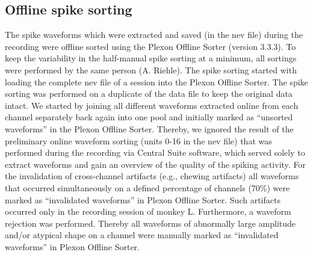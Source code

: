 \subsection{Offline spike sorting}
\label{sec:offline_spike_sorting}
The spike waveforms which were extracted and saved (in the nev file) during the recording were offline sorted using the Plexon Offline Sorter (version 3.3.3). To keep the variability in the half-manual spike sorting at a minimum, all sortings were performed by the same person (A. Riehle). The spike sorting started with loading the complete nev file of a session into the Plexon Offline Sorter. The spike sorting was performed on a duplicate of the data file to keep the original data intact. We started by joining all different waveforms extracted online from each channel separately back again into one pool and initially marked as “unsorted waveforms” in the Plexon Offline Sorter. Thereby, we ignored the result of the preliminary online waveform sorting (units 0-16 in the nev file) that was performed during the recording via Central Suite software, which served solely to extract waveforms and gain an overview of the quality of the spiking activity. For the invalidation of cross-channel artifacts (e.g., chewing artifacts) all waveforms that occurred simultaneously on a defined percentage of channels (70\%) were marked as “invalidated waveforms” in Plexon Offline Sorter. Such artifacts occurred only in the recording session of monkey L. Furthermore, a waveform rejection was performed. Thereby all waveforms of abnormally large amplitude and/or atypical shape on a channel were manually marked as “invalidated waveforms” in Plexon Offline Sorter.

